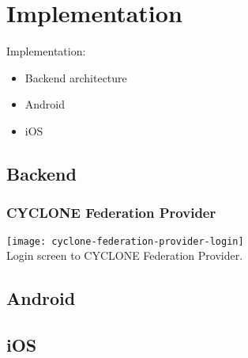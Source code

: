 \chapter{Implementation}
\label{cha:implementation}

Implementation:
\begin{itemize}
    \item Backend architecture
    \item Android
    \item iOS
\end{itemize}


\vspace{0.5cm}

\section{Backend}

\subsection{CYCLONE Federation Provider}

\begin{center}
    \texttt{[image: cyclone-federation-provider-login]}\\
    Login screen to CYCLONE Federation Provider.
\end{center}


\vspace{0.5cm}

\section{Android}


\vspace{0.5cm}

\section{iOS}